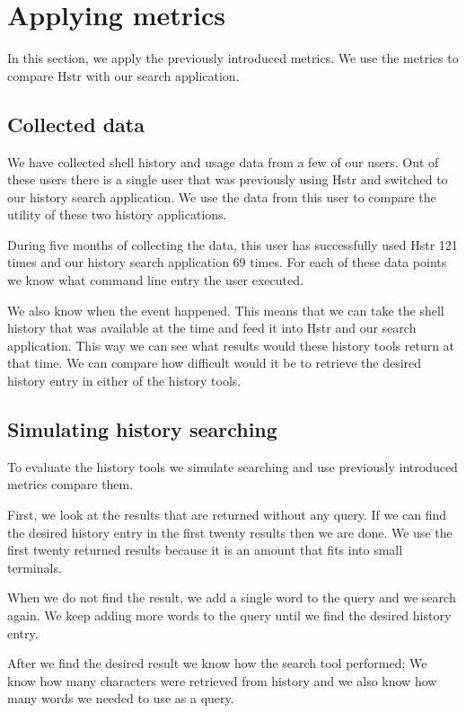 \section{Applying metrics}

In this section, we apply the previously introduced metrics. We use the metrics to compare Hstr with our search application.

\subsection{Collected data}

We have collected shell history and usage data from a few of our users. Out of these users there is a single user that was previously using Hstr and switched to our history search application. We use the data from this user to compare the utility of these two history applications.

During five months of collecting the data, this user has successfully used Hstr 121 times and our history search application 69 times. For each of these data points we know what command line entry the user executed. 

We also know when the event happened. This means that we can take the shell history that was available at the time and feed it into Hstr and our search application. This way we can see what results would these history tools return at that time. We can compare how difficult would it be to retrieve the desired history entry in either of the history tools. 

\subsection{Simulating history searching}

To evaluate the history tools we simulate searching and use previously introduced metrics compare them.

First, we look at the results that are returned without any query. If we can find the desired history entry in the first twenty results then we are done. We use the first twenty returned results because it is an amount that fits into small terminals. 

When we do not find the result, we add a single word to the query and we search again. We keep adding more words to the query until we find the desired history entry. 

After we find the desired result we know how the search tool performed; We know how many characters were retrieved from history and we also know how many words we needed to use as a query.

